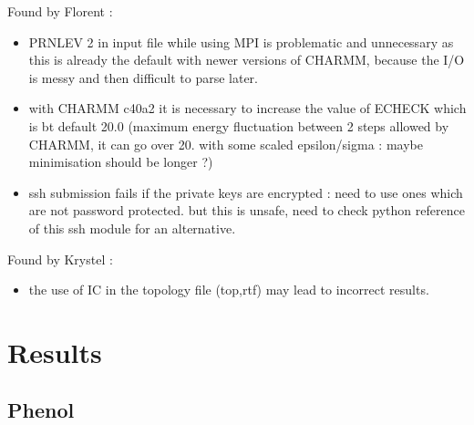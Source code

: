 \documentclass[12pt,a4paper]{article}
\begin{document}
Found by Florent :
\begin{itemize}
\item PRNLEV 2 in input file while using MPI is problematic and unnecessary as this is already the 
default with newer versions of CHARMM, because the I/O is messy and then difficult to parse later.
\item with CHARMM c40a2 it is necessary to increase the value of ECHECK which is bt default 20.0 
(maximum energy fluctuation between 2 steps allowed by CHARMM, it can go over 20. with some scaled 
epsilon/sigma : maybe minimisation should be longer ?)
\item ssh submission fails if the private keys are encrypted : need to use ones which are not 
password protected. but this is unsafe, need to check python reference of this ssh module for an 
alternative. 
\end{itemize}

Found by Krystel : 
\begin{itemize}
\item the use of IC in the topology file (top,rtf) may lead to incorrect results.
\end{itemize}


\section{Results}

\subsection{Phenol}
\end{document}
